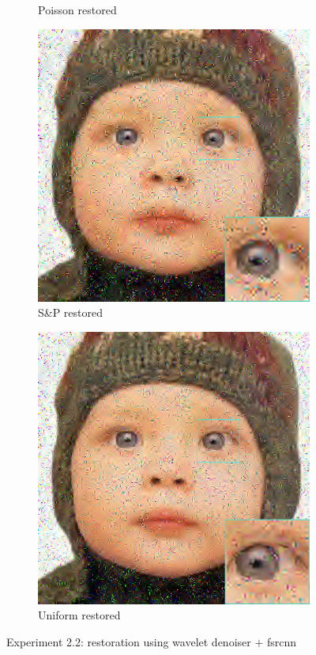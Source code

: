 \begin{figure}
\begin{subfigure}{0.24\textwidth}
		\caption{Poisson restored}
	\end{subfigure}
	\begin{subfigure}{0.24\textwidth}
		\includegraphics[width=\textwidth]{images/exp2.2/salt.png}
		\caption{S\&P restored}
	\end{subfigure}
	\begin{subfigure}{0.24\textwidth}
		\includegraphics[width=\textwidth]{images/exp2.2/uniform.png}
		\caption{Uniform restored}
	\end{subfigure}
	\caption{Experiment 2.2: restoration using wavelet denoiser $+$ \gls{fsrcnn}}
	\label{fig:exp2.2}
\end{figure}

